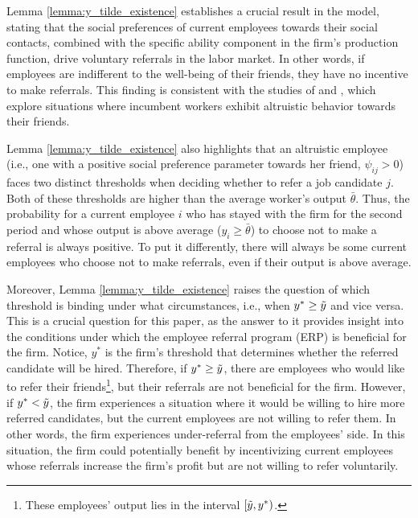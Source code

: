 \documentclass[12pt]{article}
\begin{document}
Lemma \ref{lemma:y_tilde_existence} establishes a crucial result in the model, stating that the social preferences of current employees towards their social contacts, combined with the specific ability component in the firm's production function, drive voluntary referrals in the labor market. In other words, if employees are indifferent to the well-being of their friends, they have no incentive to make referrals. This finding is consistent with the studies of \cite{bandiera2009social} and \cite{friebel2023employee}, which explore situations where incumbent workers exhibit altruistic behavior towards their friends.

Lemma \ref{lemma:y_tilde_existence} also highlights that an altruistic employee (i.e., one with a positive social preference parameter towards her friend, $\psi_{ij} > 0$) faces two distinct thresholds when deciding whether to refer a job candidate $j$. Both of these thresholds are higher than the average worker's output $\bar{\theta}$. Thus, the probability for a current employee $i$ who has stayed with the firm for the second period and whose output is above average ($y_i \geq \bar{\theta}$) to choose not to make a referral is always positive. To put it differently, there will always be some current employees who choose not to make referrals, even if their output is above average. %

Moreover, Lemma \ref{lemma:y_tilde_existence} raises the question of which threshold is binding under what circumstances, i.e., when $y^* \geq \Tilde{y}$ and vice versa. This is a crucial question for this paper, as the answer to it provides insight into the conditions under which the employee referral program (ERP) is beneficial for the firm. Notice, $y^*$ is the firm's threshold that determines whether the referred candidate will be hired. Therefore, if $y^* \geq \Tilde{y}$, there are employees who would like to refer their friends\footnote{These employees' output lies in the interval $[\Tilde{y}, y^*)$.}, but their referrals are not beneficial for the firm. However, if $y^* < \Tilde{y}$, the firm experiences a situation where it would be willing to hire more referred candidates, but the current employees are not willing to refer them. In other words, the firm experiences under-referral from the employees' side. In this situation, the firm could potentially benefit by incentivizing current employees whose referrals increase the firm's profit but are not willing to refer voluntarily.
\end{document}
